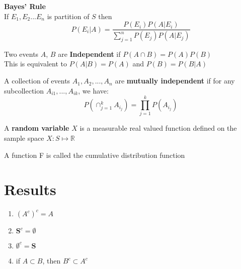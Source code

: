 \documentclass[14pt, oneside, letterpaper]{notes}
\begin{document}
\begin{mydef}
	\textbf{Bayes' Rule} \\
	If ${E_1, E_2 ... E_n}$ is partition of $S$ then \\
	\[ P(E_i|A) = \frac{P(E_i)P(A|E_i)}
	{\sum_{j=1}^{n}P(E_j)P(A|E_j)} \]
\end{mydef}

\begin{mydef}
	Two events $A$, $B$ are \textbf{Independent} if
	$P(A \cap B) = P(A)P(B)$ \\
	This is equivalent to $P(A|B) = P(A)$ and 
	$P(B) = P(B|A)$
\end{mydef}

\begin{mydef}
	A collection of events $A_1, A_2, ..., A_n$ are 
	\textbf{mutually independent} if for any subcollection
	$A_{i1}, ..., A_{ik}$, we have:
	\[ P(\cap_{j=1}^k A_{i_j}) = \prod_{j=1}^k P(A_{i_j}) \]
\end{mydef}


%
%

\begin{mydef}
	A \textbf{random variable} $X$ is a measurable real 
	valued function defined on the sample space 
	$X : S \mapsto \mathbb{R}$
\end{mydef}

\begin{mydef}
	A function F is called the cumulative distribution
	function
\end{mydef}















\section*{Results}
\begin{enumerate}
\item $(A^c)^c = A$
\item $\textbf{S}^c = \emptyset $
\item $ \emptyset^c = \textbf{S} $
\item if $A \subset B$, then $B^c \subset A^c$
\end{enumerate}

%
%
\end{document}
